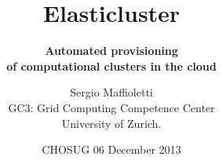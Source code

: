 \documentclass[english,serif,mathserif,usenames,dvipsnames]{beamer}
\begin{document}
\title[elasticluster]{Elasticluster}
\subtitle{\textbf{Automated provisioning \\ of computational clusters in the cloud}}

\author[S. Maffioletti]{Sergio Maffioletti \\
GC3: Grid Computing Competence Center \\
University of Zurich.}
\date{CHOSUG 06 December 2013}



\maketitle
\end{document}
